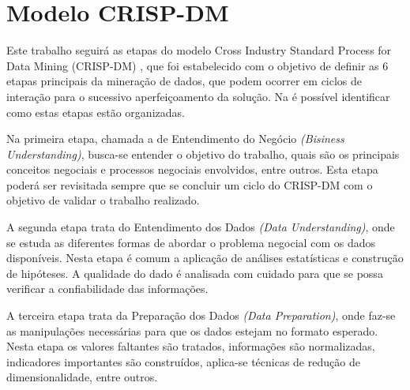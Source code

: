 


\section{Modelo CRISP-DM}%

Este trabalho seguirá as etapas do modelo Cross Industry Standard Process for Data Mining (CRISP-DM) \cite{crispdm}, que foi estabelecido com o objetivo de definir as 6 etapas principais da mineração de dados, que podem ocorrer em ciclos de interação para o sucessivo aperfeiçoamento da solução. Na  é possível identificar como estas etapas estão organizadas. 

%

    Na primeira etapa, chamada a de Entendimento do Negócio \textit{(Bisiness Understanding)}, busca-se entender o objetivo do trabalho, quais são os principais conceitos negociais e processos negociais envolvidos, entre outros. Esta etapa poderá ser revisitada sempre que se concluir um ciclo do CRISP-DM com o objetivo de validar o trabalho realizado. 
    
A segunda etapa trata do Entendimento dos Dados \textit{(Data Understanding)}, onde se estuda as diferentes formas de abordar o problema negocial com os dados disponíveis. Nesta etapa é comum a aplicação de análises estatísticas e construção de hipóteses. A qualidade do dado é analisada com cuidado para que se possa verificar a confiabilidade das informações. 

A terceira etapa trata da Preparação dos Dados \textit{(Data Preparation)}, onde faz-se as manipulações necessárias para que os dados estejam no formato esperado. Nesta etapa os valores faltantes são tratados, informações são normalizadas, indicadores importantes são construídos, aplica-se técnicas de redução de dimensionalidade, entre outros. 

